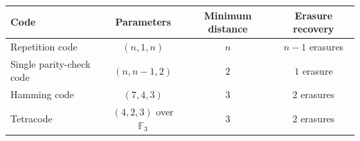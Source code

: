 \documentclass[11pt]{article}
\theoremstyle{definition}
\theoremstyle{remark}
\newcommand{\F}{\mathbb{F}}
\begin{document}
\begin{center}
\renewcommand{\arraystretch}{1.18}
\begin{tabular}{@{}lccc@{}}
\toprule
Code & Parameters & Minimum distance & Erasure recovery \\
\midrule
Repetition code & $(n,1,n)$ & $n$ & $n-1$ erasures \\
Single parity-check code & $(n,n-1,2)$ & $2$ & $1$ erasure \\
Hamming code & $(7,4,3)$ & $3$ & $2$ erasures \\
Tetracode & $(4,2,3)$ over $\F_3$ & $3$ & $2$ erasures \\
\bottomrule
\end{tabular}
\end{center}
\end{document}
